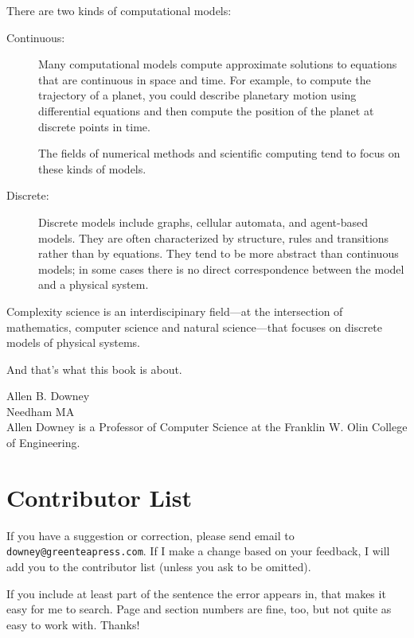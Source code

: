 \documentclass[10pt]{book}
\begin{document}
There are two kinds of computational models:

\begin{description}

\item[Continuous:] Many computational models compute approximate
  solutions to equations that are continuous in space and time.  For
  example, to compute the trajectory of a planet, you could describe
  planetary motion using differential equations and then compute the
  position of the planet at discrete points in time.

The fields of numerical methods and scientific computing
tend to focus on these kinds of models.

\item[Discrete:] Discrete models include graphs, cellular automata,
  and agent-based models.  They are often characterized by structure,
  rules and transitions rather than by equations.  They tend to be
  more abstract than continuous models; in some cases there is no
  direct correspondence between the model and a physical system.

\end{description}

Complexity science is an interdiscipinary field---at the intersection
of mathematics, computer science and natural science---that focuses on
discrete models of physical systems.

And that's what this book is about.


Allen B. Downey \\
Needham MA\\

Allen Downey is a Professor of Computer Science at 
the Franklin W. Olin College of Engineering.




\section*{Contributor List}


If you have a suggestion or correction, please send email to 
{\tt downey@greenteapress.com}.  If I make a change based on your
feedback, I will add you to the contributor list
(unless you ask to be omitted).

If you include at least part of the sentence the
error appears in, that makes it easy for me to search.  Page and
section numbers are fine, too, but not quite as easy to work with.
Thanks!
\end{document}
